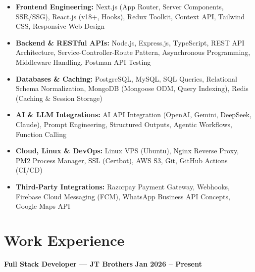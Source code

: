 \documentclass[a4paper,10pt]{article}
\begin{document}
\begin{itemize}

    \item \textbf{Frontend Engineering:}
    Next.js (App Router, Server Components, SSR/SSG), React.js (v18+, Hooks),
    Redux Toolkit, Context API, Tailwind CSS, Responsive Web Design

    \item \textbf{Backend \& RESTful APIs:}
    Node.js, Express.js, TypeScript, REST API Architecture, Service-Controller-Route Pattern,
    Asynchronous Programming, Middleware Handling, Postman API Testing

    \item \textbf{Databases \& Caching:}
    PostgreSQL, MySQL, SQL Queries, Relational Schema Normalization,
    MongoDB (Mongoose ODM, Query Indexing), Redis (Caching \& Session Storage)

    \item \textbf{AI \& LLM Integrations:}
    AI API Integration (OpenAI, Gemini, DeepSeek, Claude), Prompt Engineering,
    Structured Outputs, Agentic Workflows, Function Calling

    \item \textbf{Cloud, Linux \& DevOps:}
    Linux VPS (Ubuntu), Nginx Reverse Proxy, PM2 Process Manager, SSL (Certbot),
    AWS S3, Git, GitHub Actions (CI/CD)

    \item \textbf{Third-Party Integrations:}
    Razorpay Payment Gateway, Webhooks, Firebase Cloud Messaging (FCM),
    WhatsApp Business API Concepts, Google Maps API

\end{itemize}

\section*{Work Experience}

\textbf{Full Stack Developer --- JT Brothers}
\hfill
\textbf{Jan 2026 -- Present}
\end{document}
